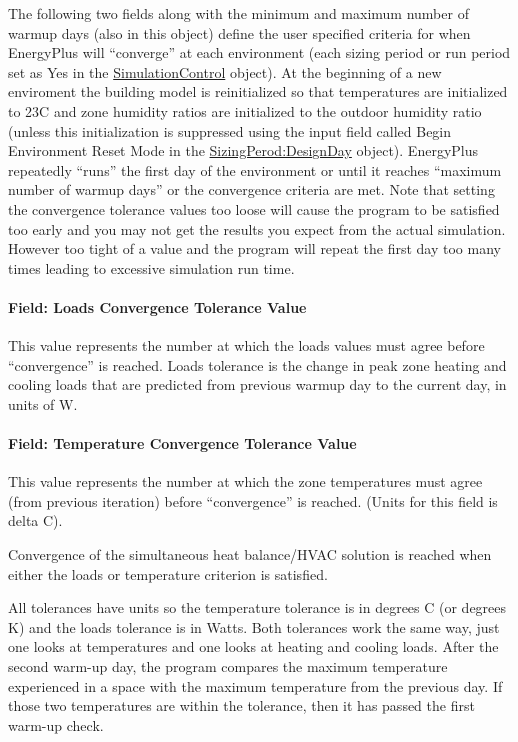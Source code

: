 The following two fields along with the minimum and maximum number of warmup days (also in this object) define the user specified criteria for when EnergyPlus will ``converge'' at each environment (each sizing period or run period set as Yes in the \hyperref[simulationcontrol]{SimulationControl} object). At the beginning of a new enviroment the building model is reinitialized so that temperatures are initialized to 23C and zone humidity ratios are initialized to the outdoor humidity ratio  (unless this initialization is suppressed using the input field called Begin Environment Reset Mode in the \hyperref[sizingperioddesignday]{SizingPerod:DesignDay} object).  EnergyPlus repeatedly ``runs'' the first day of the environment or until it reaches ``maximum number of warmup days'' or the convergence criteria are met. Note that setting the convergence tolerance values too loose will cause the program to be satisfied too early and you may not get the results you expect from the actual simulation. However too tight of a value and the program will repeat the first day too many times leading to excessive simulation run time.

\paragraph{Field: Loads Convergence Tolerance Value}\label{field-loads-convergence-tolerance-value}

This value represents the number at which the loads values must agree before ``convergence'' is reached. Loads tolerance is the change in peak zone heating and cooling loads that are predicted from previous warmup day to the current day, in units of W.

\paragraph{Field: Temperature Convergence Tolerance Value}\label{field-temperature-convergence-tolerance-value}

This value represents the number at which the zone temperatures must agree (from previous iteration) before ``convergence'' is reached. (Units for this field is delta C).

Convergence of the simultaneous heat balance/HVAC solution is reached when either the loads or temperature criterion is satisfied.

All tolerances have units so the temperature tolerance is in degrees C (or degrees K) and the loads tolerance is in Watts. Both tolerances work the same way, just one looks at temperatures and one looks at heating and cooling loads. After the second warm-up day, the program compares the maximum temperature experienced in a space with the maximum temperature from the previous day. If those two temperatures are within the tolerance, then it has passed the first warm-up check.

